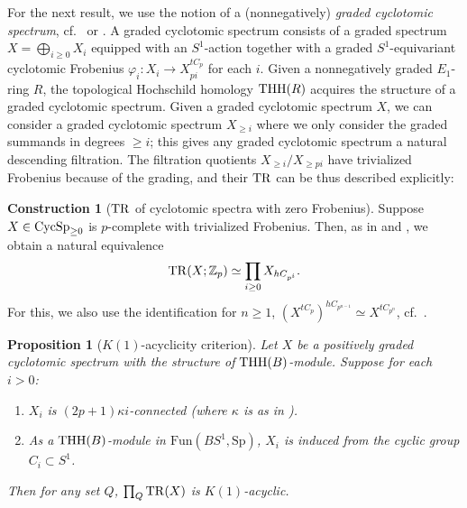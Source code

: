 \documentclass{amsart}
\renewcommand{\sp}{\mathrm{Sp}}
\newtheorem{proposition}[theorem]{Proposition}
\theoremstyle{definition}
\newcommand{\fun}{\mathrm{Fun}}
\newtheorem{construction}[theorem]{Construction}
\begin{document}
For the next result, we use the notion of a (nonnegatively) \emph{graded cyclotomic spectrum},
cf.~\cite[Sec.~3 and App.~A]{AMNN} or \cite{Bru01}. 
A graded cyclotomic spectrum 
consists of a 
graded spectrum $X = \bigoplus_{i \geq 0} X_i$ equipped with an $S^1$-action together
with a graded $S^1$-equivariant cyclotomic
Frobenius $\varphi_i \colon  X_i \to X_{pi}^{tC_p}$ for each $i$.  
Given a nonnegatively graded $E_1$-ring $R$, the topological Hochschild homology
$\mathrm{THH}(R)$ acquires the structure of a graded cyclotomic spectrum. 
Given a graded cyclotomic spectrum $X$, we can consider a graded
cyclotomic spectrum $X_{\geq i}$ where we only consider the graded summands in
degrees $\geq i$; this gives any graded cyclotomic spectrum a natural descending
filtration. 
The filtration quotients $X_{\geq i}/X_{\geq pi}$ have trivialized Frobenius
because of the grading, and their $\mathrm{TR}$ can be thus described explicitly: 

\begin{construction}[$\mathrm{TR}$ of cyclotomic spectra with zero Frobenius] 
Suppose $X \in \mathrm{CycSp}_{\geq 0}$ is $p$-complete with trivialized Frobenius. Then, 
as in \cite[Rem.~2.5]{AN} and \cite[Cor.~II.4.7]{NS18},
we obtain
a natural equivalence
\begin{equation} \label{TRFrobzero}  \mathrm{TR}(X; \mathbb{Z}_p) \simeq \prod_{i \geq 0} X_{hC_{p^i}}.  \end{equation}
For this, we also use the identification for $n \geq 1$,
$(X^{tC_p})^{hC_{p^{n-1}}} \simeq X^{tC_{p^n}}$, cf.~\cite[Lem.~II.4.1]{NS18}. 
\end{construction} 



\begin{proposition}[$K(1)$-acyclicity criterion]
\label{k1acyccrit}
Let $X$ be a positively graded cyclotomic spectrum with the structure of
$\mathrm{THH}(B)$-module. Suppose for each $i > 0$: 
\begin{enumerate}
\item  
$X_i$ is $ (2p+ 1) \kappa i $-connected (where $\kappa$ is as in ).  
\item
As a $\mathrm{THH}(B)$-module in  $\fun(BS^1, \sp)$, $X_i$ is induced from the
cyclic group $C_i \subset S^1$. 
\end{enumerate}
Then for any set $Q$, $\prod_Q \mathrm{TR}(X)$ is $K(1)$-acyclic. 
\end{proposition} 
\end{document}
